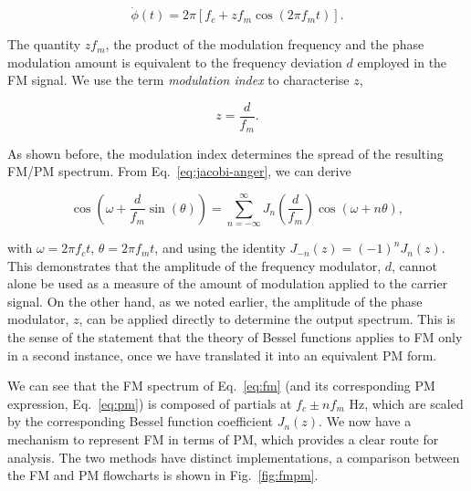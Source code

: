 \documentclass[]{interact}
\begin{document}
\begin{equation}
\dot{\phi}(t) = 2\pi \left [f_c  + z f_m \cos(2\pi f_m t) \right]. 
\end{equation}

The quantity $z f_m$, the product of the modulation frequency and the phase modulation amount
is equivalent to the frequency deviation $d$ employed in the FM signal. We use the term 
\emph{modulation index} to characterise $z$,

\begin{equation}\label{eq:deviation_fm}
z =  \frac d {f_m}.
\end{equation}

As shown before, the modulation index determines the spread of the resulting FM/PM spectrum.
From Eq.~\ref{eq:jacobi-anger}, we can derive

\begin{equation}\label{eq:pm_synthesis}
\cos\left(\omega + \frac d {f_m} \sin(\theta)\right) = \sum_{n=-\infty}^{\infty} J_n\left(\frac d {f_m}\right)\cos\left(\omega + n\theta\right),
\end{equation}

\noindent with $\omega = 2\pi f_c t$, $\theta = 2\pi f_m t$, and using the identity $J_{-n}(z) = (-1)^n J_n(z)$. 
This demonstrates that the amplitude of the frequency modulator, $d$, cannot alone be used as
a measure of the amount of modulation applied to the carrier signal. On the other hand,
as we noted earlier, the amplitude of the phase modulator, $z$, can be applied directly to determine the output spectrum.
This is the sense of the statement that the theory of Bessel functions applies to FM only in a second instance, once
we have translated it into an equivalent PM form.

We can see that the FM spectrum of Eq.~\ref{eq:fm} (and its corresponding PM expression, Eq.~\ref{eq:pm}) is composed of partials at $f_c \pm n f_m$ Hz, which are scaled by the corresponding Bessel function coefficient $J_n(z)$. We now have a mechanism to 
represent FM in terms of PM, which provides a clear route for analysis. The two
methods have distinct implementations, a comparison between the FM and PM flowcharts 
is shown in Fig.~\ref{fig:fmpm}.
\end{document}
